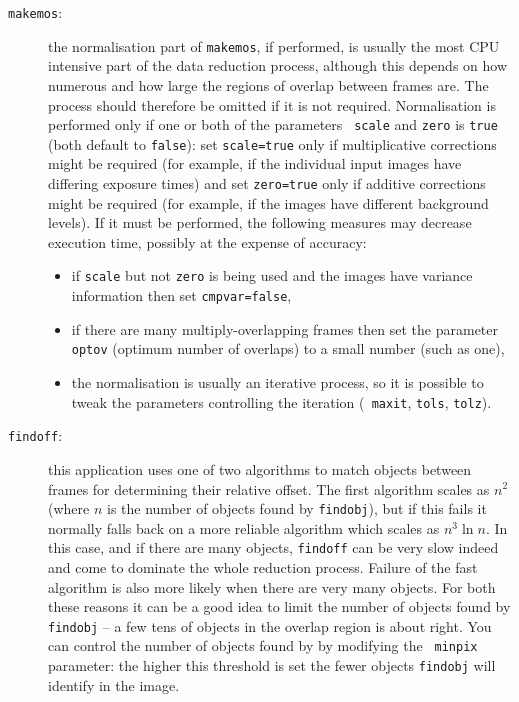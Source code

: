 \documentclass[twoside,11pt]{article}
\begin{document}
\begin{description}
  \item[{\tt makemos}:] the normalisation part of {\tt makemos}, if performed,
   is usually the most CPU intensive part of the data reduction process,
   although this depends on how numerous and how large the regions of overlap
   between frames are.
   The process should therefore be omitted if it is not required.
   Normalisation is performed only if one or both of the parameters {\tt
   scale} and {\tt zero} is {\tt true} (both default to {\tt false}):
   set {\tt scale=true} only if multiplicative corrections might be required
   (for example, if the individual input images have differing exposure times)
   and set {\tt zero=true} only if additive corrections might be required
   (for example, if the images have different background levels).
   If it must be performed, the following measures may decrease execution
   time, possibly at the expense of accuracy:

  \begin{itemize}

    \item if {\tt scale} but not {\tt zero} is being used and the images
     have variance information then set {\tt cmpvar=false},

    \item if there are many multiply-overlapping frames then set the
     parameter {\tt optov} (optimum number of overlaps) to a small number
     (such as one),

    \item the normalisation is usually an iterative process, so it is
     possible to tweak the parameters controlling the iteration ({\tt
     maxit}, {\tt tols}, {\tt tolz}).

  \end{itemize}

  \item[{\tt findoff}:] this application uses one of two algorithms to match
   objects between frames for determining their relative offset.
   The first algorithm scales as $n^2$ (where $n$ is the number of objects
   found by {\tt findobj}), but if this fails it normally falls back on a
   more reliable algorithm which scales as $n^3 \ln n$.
   In this case, and if there are many objects, {\tt findoff} can be very
   slow indeed and come to dominate the whole reduction process.
   Failure of the fast algorithm is also more likely when there are
   very many objects.
   For both these reasons it can be a good idea to limit the number of 
   objects found by {\tt findobj} -- a few tens of objects in the overlap
   region is about right.
   You can control the number of objects found by by modifying the {\tt 
   minpix} parameter: the higher this threshold is set the fewer 
   objects {\tt findobj} will identify in the image.

\end{description}
\end{document}
